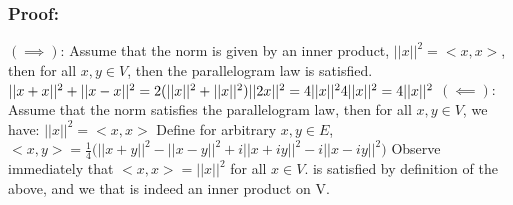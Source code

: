 \documentclass[12pt]{article}
\begin{document}
\subsubsection*{Proof:}
$(\implies)$: Assume that the norm is given by an inner product, $||x||^2 = <x,x>$, then for all $x,y \in V$, then the parallelogram law is satisfied. 
\newline
\begin{math}
    ||x+x||^2 + ||x-x||^2 = 2(||x||^2 + ||x||^2) \\
    ||2x||^2 = 4||x||^2 \\
    4||x||^2 = 4||x||^2 \\
\end{math}
\newline
$(\impliedby)$: Assume that the norm satisfies the parallelogram law, then for all $x,y \in V$, we have:
$||x||^2 = <x,x>$
Define for arbitrary $x,y \in E$,
\begin{math}\label{eq:*}
    <x,y> = \frac{1}{4} \biggl(||x+y||^2 - ||x-y||^2 + i||x+iy||^2 - i||x-iy||^2 \biggr)
\end{math}
Observe immediately that $<x,x> = ||x||^2$ for all $x \in V$. is satisfied by definition of the above, and we that is indeed an inner product on V.
\end{document}
